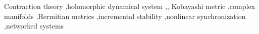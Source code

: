 \documentclass[preprint,12pt,authoryear]{elsarticle}
\begin{document}
\begin{frontmatter}
%
%
%
%
%
%
%
%
%
%
%

\begin{keyword}
Contraction theory \sep holomorphic dynamical system \sep, Kobayashi metric \sep complex manifolds \sep Hermitian metrics \sep incremental stability \sep nonlinear synchronization \sep networked systems
\end{keyword}

\end{frontmatter}
\end{document}
